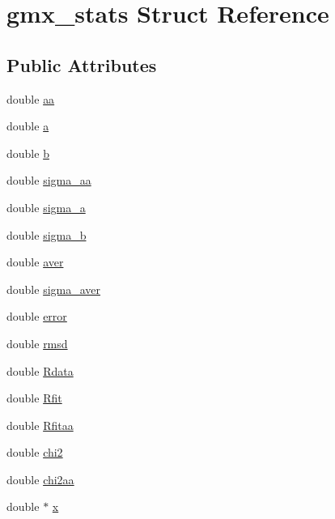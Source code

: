 \hypertarget{structgmx__stats}{\section{gmx\-\_\-stats \-Struct \-Reference}
\label{structgmx__stats}
}
\subsection*{\-Public \-Attributes}
\begin{DoxyCompactItemize}
\item 
double \hyperlink{structgmx__stats_a4482e7837a53bcff31c0b5e79a7cc193}{aa}
\item 
double \hyperlink{structgmx__stats_a8ea3f1a34d74c21abbbc9ce1cd300a57}{a}
\item 
double \hyperlink{structgmx__stats_a8ba2b2d7793176d55c85cf63832928a2}{b}
\item 
double \hyperlink{structgmx__stats_a1513b1e4e4369d5dce6f7fa53f16117e}{sigma\-\_\-aa}
\item 
double \hyperlink{structgmx__stats_ad0524c1b38ea17199aeb009f38c972c8}{sigma\-\_\-a}
\item 
double \hyperlink{structgmx__stats_a919f6f0eb277a1a9ee89faedde4c765d}{sigma\-\_\-b}
\item 
double \hyperlink{structgmx__stats_a5dff345ff0e49f647e57c05094bc23e9}{aver}
\item 
double \hyperlink{structgmx__stats_a57876d59817d9ca03b75f3ed4595ead4}{sigma\-\_\-aver}
\item 
double \hyperlink{structgmx__stats_add0443fb929842b588390a61c5a0936a}{error}
\item 
double \hyperlink{structgmx__stats_a6c00f7b3c6d77a4059703f1ee05aae85}{rmsd}
\item 
double \hyperlink{structgmx__stats_a15c62eaaceb37344439c35915b47030e}{\-Rdata}
\item 
double \hyperlink{structgmx__stats_aef9fd05197b695e769616f580f40d958}{\-Rfit}
\item 
double \hyperlink{structgmx__stats_a174b5f73e78054d324a9c3d4624dc05c}{\-Rfitaa}
\item 
double \hyperlink{structgmx__stats_a2fc31020e2bd53cbed7c051a5e55de32}{chi2}
\item 
double \hyperlink{structgmx__stats_a35d340af74cf194673de504ef6d93499}{chi2aa}
\item 
double $\ast$ \hyperlink{structgmx__stats_ab5b50130f3adb11acbbcc80d50a4a0a2}{x}
\item 

\end{DoxyCompactItemize}
